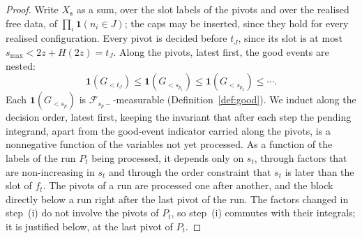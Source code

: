 \begin{proof}
Write $X_{\mathfrak s}$ as a sum, over the slot labels of the pivots and over the realised free data, of
$\prod_i\mathbf 1(n_i\in J)$; the caps may be inserted, since they hold for every realised configuration. Every pivot is decided before $t_J$, since its slot is at most $s_{\max}<2z+H(2z)=t_J$. Along the pivots, latest first, the good events are
nested:
\[
  \mathbf 1(G_{<t_J})\le\mathbf 1(G_{<s_{p_1}})\le\mathbf 1(G_{<s_{p_2}})\le\cdots .
\]
Each $\mathbf 1(G_{<s_{p}})$ is $\mathcal F_{s_p-}$-measurable (Definition~\ref{def:good}). We induct along the decision
order, latest first, keeping the invariant that after each step the pending integrand, apart from the good-event
indicator carried along the pivots, is a nonnegative function of the variables not yet processed. As a function of the
labels of the run $P_t$ being processed, it depends only on $s_t$, through factors that are non-increasing in $s_t$ and
through the order constraint that $s_t$ is later than the slot of $f_t$. The pivots of a run are processed one after another, and the block
directly below a run right after the last pivot of the run. The factors changed in step~(i) do not involve the pivots
of $P_t$, so step~(i) commutes with their integrals; it is justified below, at the last pivot of $P_t$.


\end{proof}
